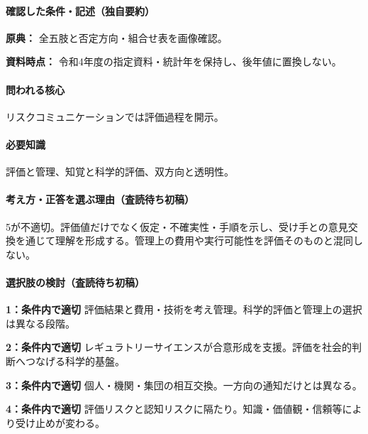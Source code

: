 \paragraph{確認した条件・記述（独自要約）}\mbox{}\par

\noindent\textbf{原典：} 全五肢と否定方向・組合せ表を画像確認。\par

\noindent\textbf{資料時点：} 令和4年度の指定資料・統計年を保持し、後年値に置換しない。\par

\paragraph{問われる核心} リスクコミュニケーションでは評価過程を開示。

\paragraph{必要知識} 評価と管理、知覚と科学的評価、双方向と透明性。

\paragraph{考え方・正答を選ぶ理由（査読待ち初稿）} 5が不適切。評価値だけでなく仮定・不確実性・手順を示し、受け手との意見交換を通じて理解を形成する。管理上の費用や実行可能性を評価そのものと混同しない。

\paragraph{選択肢の検討（査読待ち初稿）}\mbox{}\par

\noindent\textbf{1：条件内で適切} 評価結果と費用・技術を考え管理。科学的評価と管理上の選択は異なる段階。\par

\noindent\textbf{2：条件内で適切} レギュラトリーサイエンスが合意形成を支援。評価を社会的判断へつなげる科学的基盤。\par

\noindent\textbf{3：条件内で適切} 個人・機関・集団の相互交換。一方向の通知だけとは異なる。\par

\noindent\textbf{4：条件内で適切} 評価リスクと認知リスクに隔たり。知識・価値観・信頼等により受け止めが変わる。\par

